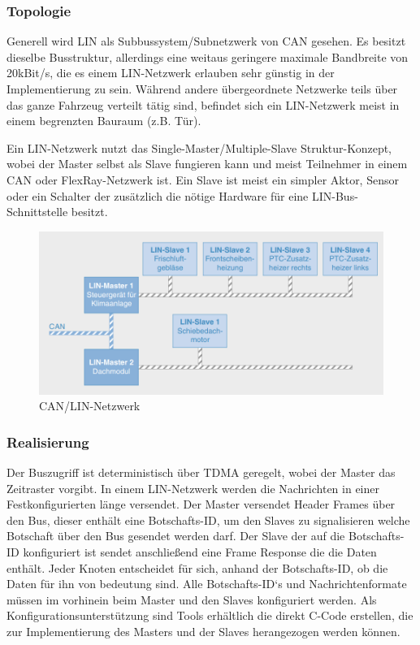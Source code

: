     \subsubsection{Topologie}
    Generell wird LIN als Subbussystem/Subnetzwerk von CAN gesehen. Es besitzt dieselbe
    Busstruktur, allerdings eine weitaus geringere maximale Bandbreite von 20kBit/s, 
    die es einem LIN-Netzwerk erlauben sehr günstig in der Implementierung zu sein.
    Während andere übergeordnete Netzwerke teils über das ganze Fahrzeug verteilt tätig sind,
    befindet sich ein LIN-Netzwerk meist in einem begrenzten Bauraum (z.B. Tür).
    ~\cite{reif2011bosch}

    Ein LIN-Netzwerk nutzt das Single-Master/Multiple-Slave Struktur-Konzept, wobei der Master
    selbst als Slave fungieren kann und meist Teilnehmer in einem CAN oder FlexRay-Netzwerk ist.
    Ein Slave ist meist ein simpler Aktor, Sensor oder ein Schalter der zusätzlich die nötige Hardware 
    für eine LIN-Bus-Schnittstelle besitzt.
    ~\cite{reif2011bosch}
    ~\cite{LA_LIN1}
    
    \begin{figure}[h!]
        \includegraphics[width=\linewidth]{./images/Kapitel4/LIN_Bus.png}
        \caption[
            Bosch Autoelektrik und Autoelektronik S.111 \cite{reif2011bosch}]
            {CAN/LIN-Netzwerk}
    \end{figure}

    \subsubsection{Realisierung}

    Der Buszugriff ist deterministisch über TDMA geregelt, wobei der Master das Zeitraster vorgibt.
    In einem LIN-Netzwerk werden die Nachrichten in einer Festkonfigurierten länge versendet.
    Der Master versendet Header Frames über den Bus, dieser enthält eine Botschafts-ID, um 
    den Slaves zu signalisieren welche Botschaft über den Bus gesendet werden darf. Der Slave
    der auf die Botschafts-ID konfiguriert ist sendet anschließend eine Frame Response die die 
    Daten enthält. Jeder Knoten entscheidet für sich, anhand der Botschafts-ID, ob die Daten für 
    ihn von bedeutung sind.
    Alle Botschafts-ID‘s und Nachrichtenformate müssen im vorhinein beim
    Master und den Slaves konfiguriert werden. Als Konfigurationsunterstützung sind Tools 
    erhältlich die direkt C-Code erstellen, die zur Implementierung des Masters und der Slaves
    herangezogen werden können.~\cite{LA_LIN1}\cite{LA_LDF-Tool}

